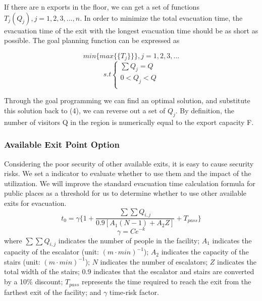  If there are n exports in the floor, we can get a set of functions $T_j(Q_j),j=1,2,3,...,n$. In order to minimize the total evacuation time, the evacuation time of the exit with the longest evacuation time should be as short as possible. The goal planning function can be expressed as

\begin{equation}
    min\{max\{\{T_j\}\}\},j=1,2,3,...
    \label{equation2}
\end{equation}
   $$ s.t\left\{
    \begin{array}{lr}
    \sum Q_j=Q\\
    0<Q_j<Q\\
    \end{array}
    \right.$$
    
Through the goal programming we can find an optimal solution, and substitute this solution back to (4), we can reverse out a set of ${Q_j}$. By definition, the number of visitors Q in the region is numerically equal to the export capacity F.

\subsubsection{Available Exit Point Option}

Considering the poor security of other available exits, it is easy to cause security risks. We set a indicator to evaluate whether to use them and the impact of the utilization. We will improve the standard evacuation time calculation formula for public places as a threshold for us to determine whether to use other available exits for evacuation.
\begin{equation}
    t_0=\gamma\{1+\frac{\sum \sum Q_{i,j}}{0.9[A_1(N-1)+A_2Z]}+T_{pass}\}
\end{equation}
\[
\gamma=Ce^{-k}
\]
where $\sum \sum Q_{i,j}$ indicates the number of people in the facility; $A_1$ indicates the capacity of the escalator (unit: $(m·min)^{-1}$); $A_2$ indicates the capacity of the stairs (unit: $(m·min)^{-1}$); $N$ indicates the number of escalators; $Z$ indicates the total width of the stairs; 0.9 indicates that the escalator and stairs are converted by a 10\% discount; $T_{pass}$ represents the time required to reach the exit from the farthest exit of the facility; and $\gamma$ time-risk factor.

